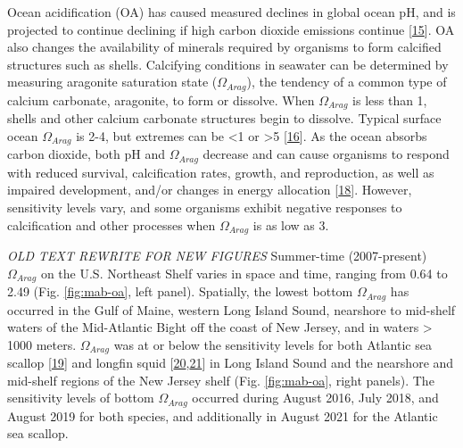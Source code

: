 \documentclass[
  10pt,
]{article}
\begin{document}
Ocean acidification (OA) has caused measured declines in global ocean pH, and is projected to continue declining if high carbon dioxide emissions continue {[}\protect\hyperlink{ref-intergovernmental_panel_on_climate_change_ipcc_technical_2022}{15}{]}. OA also changes the availability of minerals required by organisms to form calcified structures such as shells. Calcifying conditions in seawater can be determined by measuring aragonite saturation state (\(\Omega_{Arag}\)), the tendency of a common type of calcium carbonate, aragonite, to form or dissolve. When \(\Omega_{Arag}\) is less than 1, shells and other calcium carbonate structures begin to dissolve. Typical surface ocean \(\Omega_{Arag}\) is 2-4, but extremes can be \textless1 or \textgreater5 {[}\protect\hyperlink{ref-jiang_climatological_2015}{16}{]}. As the ocean absorbs carbon dioxide, both pH and \(\Omega_{Arag}\) decrease and can cause organisms to respond with reduced survival, calcification rates, growth, and reproduction, as well as impaired development, and/or changes in energy allocation {[}\protect\hyperlink{ref-saba_recommended_2019}{18}{]}. However, sensitivity levels vary, and some organisms exhibit negative responses to calcification and other processes when \(\Omega_{Arag}\) is as low as 3.

\emph{OLD TEXT REWRITE FOR NEW FIGURES}
Summer-time (2007-present) \(\Omega_{Arag}\) on the U.S. Northeast Shelf varies in space and time, ranging from 0.64 to 2.49 (Fig. \ref{fig:mab-oa}, left panel). Spatially, the lowest bottom \(\Omega_{Arag}\) has occurred in the Gulf of Maine, western Long Island Sound, nearshore to mid-shelf waters of the Mid-Atlantic Bight off the coast of New Jersey, and in waters \textgreater{} 1000 meters. \(\Omega_{Arag}\) was at or below the sensitivity levels for both Atlantic sea scallop {[}\protect\hyperlink{ref-cameron_effects_2022}{19}{]} and longfin squid {[}\protect\hyperlink{ref-zakroff_dose-dependence_2019}{20},\protect\hyperlink{ref-zakroff_antagonistic_2020}{21}{]} in Long Island Sound and the nearshore and mid-shelf regions of the New Jersey shelf (Fig. \ref{fig:mab-oa}, right panels). The sensitivity levels of bottom \(\Omega_{Arag}\) occurred during August 2016, July 2018, and August 2019 for both species, and additionally in August 2021 for the Atlantic sea scallop.
\end{document}
